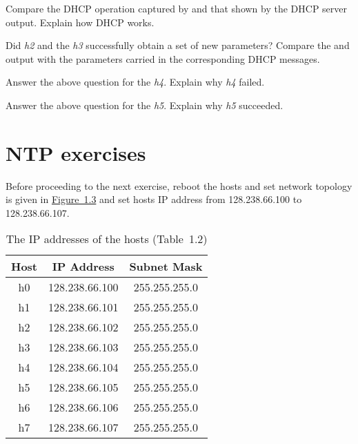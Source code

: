 \documentclass{../UTNetLab}
\begin{document}
    \begin{report}
        \item Compare the DHCP operation captured by  and that shown by the DHCP server output.
            Explain how DHCP works.

        \item Did \textit{h2} and the \textit{h3} successfully obtain a set of new parameters?
            Compare the  and  output with the parameters carried in the corresponding DHCP messages.

        \item Answer the above question for the \textit{h4}.
            Explain why \textit{h4} failed.

        \item Answer the above question for the \textit{h5}.
            Explain why \textit{h5} succeeded.
    \end{report}

\part{NTP exercises}
    Before proceeding to the next exercise, reboot the hosts and set network topology is given in \hyperref[fig:1.3]{Figure~1.3} and set hosts IP address from 128.238.66.100 to 128.238.66.107.
    \begin{center}
        \begin{minipage}{0.48\textwidth}
            \begin{flushleft}
                \begin{table}[H]
                    \caption{The IP addresses of the hosts (Table~1.2)}
                    \centering
                    \begin{tabular}{ c c c }
                        \hline \hline
                        Host & IP Address & Subnet Mask \\
                        \hline
                        h0 & 128.238.66.100 & 255.255.255.0 \\
                        h1 & 128.238.66.101 & 255.255.255.0 \\
                        h2 & 128.238.66.102 & 255.255.255.0 \\
                        h3 & 128.238.66.103 & 255.255.255.0 \\
                        h4 & 128.238.66.104 & 255.255.255.0 \\
                        h5 & 128.238.66.105 & 255.255.255.0 \\
                        h6 & 128.238.66.106 & 255.255.255.0 \\
                        h7 & 128.238.66.107 & 255.255.255.0 \\
                        \hline \hline
                        \end{tabular}
                \end{table}
            \end{flushleft}
        \end{minipage}
    \end{center}
\end{document}

